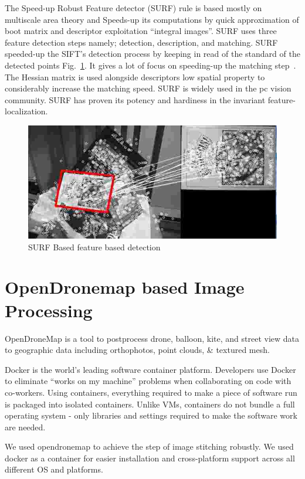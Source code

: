 The Speed-up Robust Feature detector (SURF) rule is based mostly on multiscale area theory and Speeds-up its computations by quick approximation of boot matrix and descriptor exploitation ``integral images''. SURF uses three feature detection steps namely; detection, description, and matching. SURF speeded-up the SIFT’s detection process by keeping in read of the standard of the detected points Fig.~\ref{fig: extra-8}. It gives a lot of focus on speeding-up the matching step~\cite{5}. The Hessian matrix is used alongside descriptors low spatial property to considerably increase the matching speed. SURF is widely used in the pc vision community. SURF has proven its potency and hardiness in the invariant feature-localization. 
\begin{figure}[h]
	\includegraphics[width=0.9\linewidth]{extra-8}
	\centering
	\caption{\label{fig: extra-8}SURF Based feature based detection~\cite{FeatureD76:online}}
\end{figure}

\section{OpenDronemap based Image Processing}

OpenDroneMap is a tool to postprocess drone, balloon, kite, and street view data to geographic data including orthophotos, point clouds, \& textured mesh.

Docker is the world’s leading software container platform. Developers use Docker to eliminate ``works on my machine'' problems when collaborating on code with co-workers. Using containers, everything required to make a piece of software run is packaged into isolated containers. Unlike VMs, containers do not bundle a full operating system - only libraries and settings required to make the software work are needed.

We used opendronemap to achieve the step of image stitching robustly. We used docker as a container for easier installation and cross-platform support across all different OS and platforms. 

